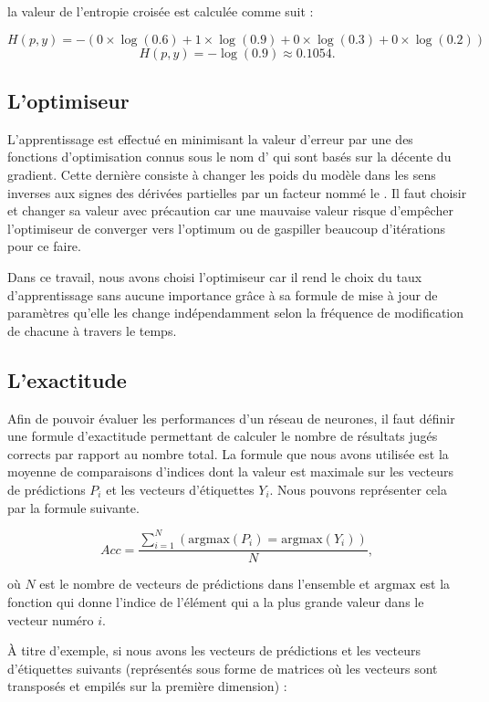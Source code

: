 la valeur de l'entropie croisée est calculée comme suit :

$$
H(p, y) = -(0 \times \log(0.6) + 1 \times \log(0.9) + 0 \times \log(0.3) + 0 \times \log(0.2))
$$
$$
H(p, y) = -\log(0.9) \approx 0.1054.
$$

\subsection{L'optimiseur}

L’apprentissage est effectué en minimisant la valeur d'erreur par une des fonctions
d'optimisation connus sous le nom d' qui sont basés sur la décente
du gradient. Cette dernière consiste à changer les poids du modèle dans les sens inverses
aux signes des dérivées partielles par un facteur nommé le .
Il faut choisir et changer sa valeur avec précaution car une mauvaise valeur
risque d'empêcher l'optimiseur de converger vers l'optimum ou de gaspiller beaucoup
d'itérations pour ce faire.\cite{DBLP:journals/corr/Ruder16}

Dans ce travail, nous avons choisi l'optimiseur  \cite{DBLP:journals/corr/abs-1212-5701}
car il rend le choix du taux d'apprentissage sans aucune importance grâce à sa
formule de mise à jour de paramètres qu'elle les change indépendamment
selon la fréquence de modification de chacune à travers le temps.\cite{DBLP:journals/corr/Ruder16}

\subsection{L'exactitude}

Afin de pouvoir évaluer les performances d'un réseau de neurones, il faut définir
une formule d'exactitude permettant de calculer le nombre de résultats jugés
corrects par rapport au nombre total. La formule que nous avons utilisée est
la moyenne de comparaisons d'indices dont la valeur est maximale sur les
vecteurs de prédictions $P_i$ et les vecteurs d'étiquettes $Y_i$. Nous pouvons représenter
cela par la formule suivante.

$$
Acc = \frac{\sum_{i=1}^N(\mathrm{argmax}(P_i) = \mathrm{argmax}(Y_i))}{N},
$$

où $N$ est le nombre de vecteurs de prédictions dans l'ensemble et
$\mathrm{argmax}$ est la fonction qui donne l'indice de l'élément qui a la plus grande
valeur dans le vecteur numéro $i$.

\`A titre d'exemple, si nous avons les vecteurs de prédictions et les vecteurs
d'étiquettes suivants (représentés sous forme de matrices où les vecteurs sont transposés
et empilés sur la première dimension) :

